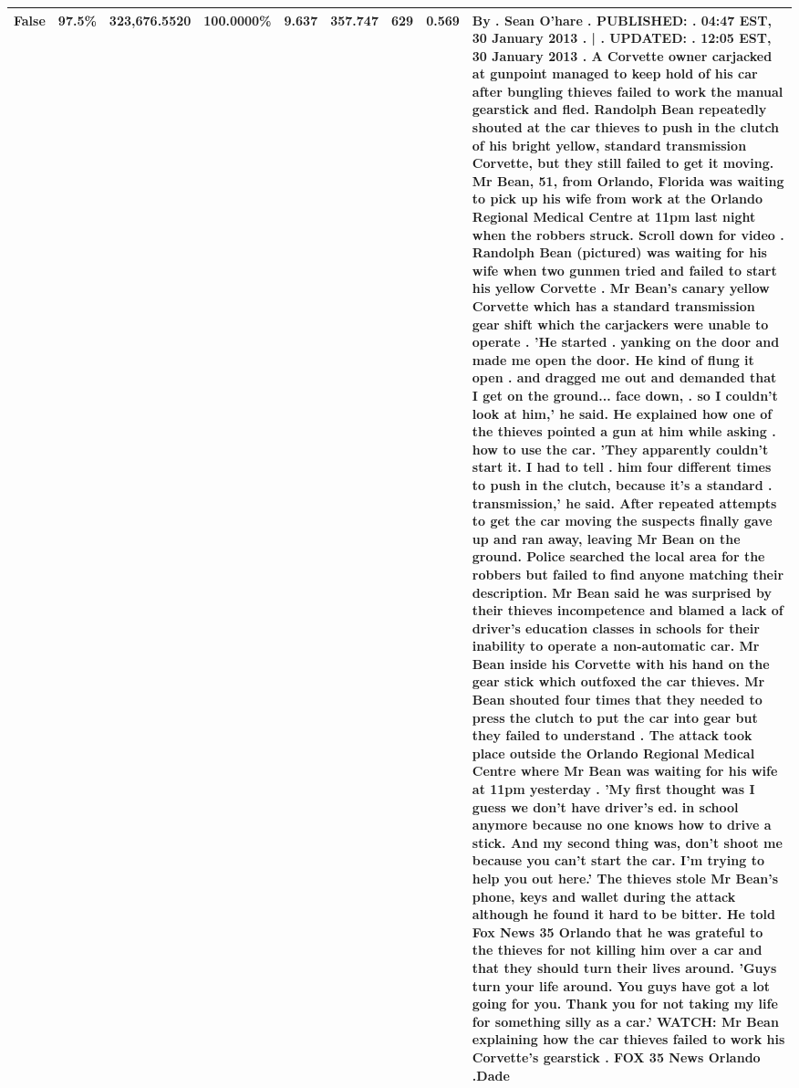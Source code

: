 \begin{table}[H]
\begin{tabular}{|m{}| m{}| r | R{0.13\textwidth}| R{0.09\textwidth}| R{0.09\textwidth}| R{0.09\textwidth}| R{0.11\textwidth}|}
False & 97.5\% & 323,676.5520 & \bfseries \color{red} 100.0000\% & 9.637 & 357.747 & 629 & 0.569 & By . Sean O'hare . PUBLISHED: . 04:47 EST, 30 January 2013 . | . UPDATED: . 12:05 EST, 30 January 2013 . A Corvette owner carjacked at gunpoint managed to keep hold of his car after bungling thieves failed to work the manual gearstick and fled. Randolph Bean repeatedly shouted at the car thieves to push in the clutch of his bright yellow, standard transmission Corvette, but they still failed to get it moving. Mr Bean, 51, from Orlando, Florida was waiting to pick up his wife from work at the Orlando Regional Medical Centre at 11pm last night when the robbers struck. Scroll down for video . Randolph Bean (pictured) was waiting for his wife when two gunmen tried and failed to start his yellow Corvette . Mr Bean's canary yellow Corvette which has a standard transmission gear shift which the carjackers were unable to operate . 'He started . yanking on the door and made me open the door. He kind of flung it open . and dragged me out and demanded that I get on the ground... face down, . so I couldn't look at him,' he said. He explained how one of the thieves pointed a gun at him while asking . how to use the car. 'They apparently couldn't start it. I had to tell . him four different times to push in the clutch, because it's a standard . transmission,' he said. After repeated attempts to get the car moving the suspects finally gave up and ran away, leaving Mr Bean on the ground. Police searched the local area for the robbers but failed to find anyone matching their description. Mr Bean said he was surprised by their thieves incompetence and blamed a lack of driver's education classes in schools for their inability to operate a non-automatic car. Mr Bean inside his Corvette with his hand on the gear stick which outfoxed the car thieves. Mr Bean shouted four times that they needed to press the clutch to put the car into gear but they failed to understand . The attack took place outside the Orlando Regional Medical Centre where Mr Bean was waiting for his wife at 11pm yesterday . 'My first thought was I guess we don't have driver's ed. in school anymore because no one knows how to drive a stick. And my second thing was, don't shoot me because you can't start the car. I'm trying to help you out here.' The thieves stole Mr Bean's phone, keys and wallet during the attack although he found it hard to be bitter. He told Fox News 35 Orlando that he was grateful to the thieves for not killing him over a car and that they should turn their lives around. 'Guys turn your life around. You guys have got a lot going for you. Thank you for not taking my life for something silly as a car.' WATCH: Mr Bean explaining how the car thieves failed to work his Corvette's gearstick . FOX 35 News Orlando .Dade \\
\bottomrule
\end{tabular}
\end{table}
